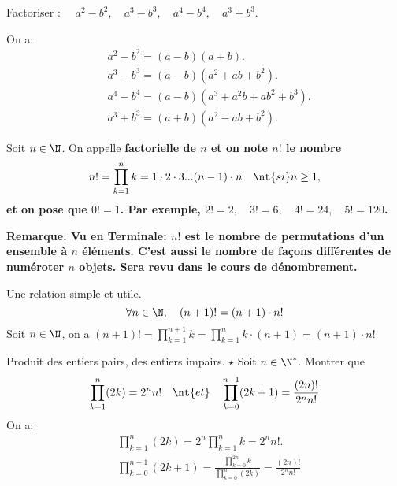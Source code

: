 \documentclass[11pt]{article}
\begin{document}
\begin{ex}{}{}
    \begin{center}
        Factoriser : $\quad a^2-b^2,\quad a^3-b^3,\quad a^4-b^4,\quad a^3+b^3$.
    \end{center}
    \tcblower
    On a:
    \begin{align*}
        &a^2-b^2=(a-b)(a+b).\\
        &a^3-b^3=(a-b)(a^2+ab+b^2).\\
        &a^4-b^4=(a-b)(a^3+a^2b+ab^2+b^3).\\
        &a^3+b^3=(a+b)(a^2-ab+b^2).
    \end{align*}
\end{ex}

\begin{defi}{}{}
    Soit $n\in\N$. On appelle \bf{factorielle} de $n$ et on note $n!$ le nombre
    \begin{equation*}
        n!=\prod_{k=1}^nk=1\cdot2\cdot3...(n-1)\cdot n \quad\nt{si }n\geq1,
    \end{equation*}
    et on pose que $0!=1$. Par exemple, $2!=2,\quad3!=6,\quad4!=24,\quad5!=120$.
\end{defi}

\bf{Remarque.} Vu en Terminale: $n!$ est le nombre de permutations d'un ensemble à $n$ éléments. C'est aussi le nombre de façons différentes de numéroter $n$ objets. Sera revu dans le cours de dénombrement.

\begin{prop}{Une relation simple et utile.}{}
    \begin{equation*}
        \forall n \in \N, \quad (n+1)! = (n+1)\cdot n!
    \end{equation*}
    \tcblower
    Soit $n\in\N$, on a $(n+1)!=\prod_{k=1}^{n+1}k=\prod_{k=1}^nk\cdot(n+1)=(n+1)\cdot n!$
\end{prop}

\begin{ex}{Produit des entiers pairs, des entiers impairs. $\star$}{}
    Soit $n\in\N^*$. Montrer que
    \begin{equation*}
        \prod_{k=1}^n(2k)=2^nn!\quad\nt{et}\quad\prod_{k=0}^{n-1}(2k+1)=\frac{(2n)!}{2^nn!}
    \end{equation*}
    \tcblower
    On a:
    \begin{align*}
        &\prod_{k=1}^n(2k)=2^n\prod_{k=1}^nk=2^nn!.\\
        &\prod_{k=0}^{n-1}(2k+1)=\frac{\prod_{k=0}^{2n}k}{\prod_{k=0}^n(2k)}=\frac{(2n)!}{2^nn!}
    \end{align*}
\end{ex}
\end{document}
